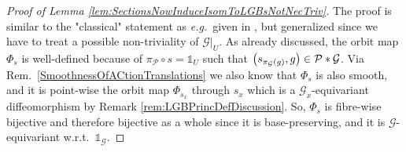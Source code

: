 \documentclass[a4paper,oneside,11pt,bibliography=totoc]{scrartcl}
\def\ba#1\ea{\begin{align}#1\end{align}}
\def\bas#1\eas{\begin{align*}#1\end{align*}}
\theoremstyle{plain}
\theoremstyle{remark}
\theoremstyle{definition}
\begin{document}
\begin{proof}[Proof of Lemma \ref{lem:SectionsNowInduceIsomToLGBsNotNecTriv}]
\leavevmode\newline
The proof is similar to the "classical" statement as \textit{e.g.}\ given in \cite[\S 4.2, proof of Lemma 4.2.7, page 210ff.]{Hamilton}, but generalized since we have to treat a possible non-triviality of $\mathcal{G}|_U$. As already discussed, the orbit map $\Phi_s$ is well-defined because of $\pi_{\mathcal{P}} \circ s = \mathds{1}_{U}$ such that $\mleft(s_{\pi_{\mathcal{G}}(g)}, g\mright) \in \mathcal{P}*\mathcal{G}$. Via Rem.\ \ref{SmoothnessOfACtionTranslations} we also know that $\Phi_s$ is also smooth,
and it is point-wise the orbit map $\Phi_{s_x}$ through $s_x$ which is a $\mathcal{G}_x$-equivariant diffeomorphism by Remark \ref{rem:LGBPrincDefDiscussion}. So, $\Phi_s$ is fibre-wise bijective and therefore bijective as a whole since it is base-preserving, and it is $\mathcal{G}$-equivariant w.r.t.\ $\mathds{1}_{\mathcal{G}}$.


\end{proof}
\end{document}
